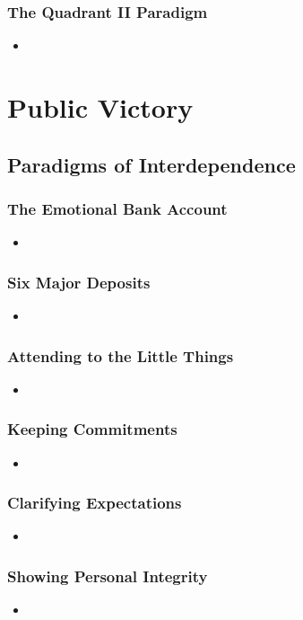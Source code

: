 \documentclass[11pt]{article}
\begin{document}
\subsubsection{The Quadrant II Paradigm}
\begin{itemize}
\item 
\end{itemize}
\section{Public Victory}
\subsection{Paradigms of Interdependence}
\subsubsection{The Emotional Bank Account}
\begin{itemize}
\item 
\end{itemize}
\subsubsection{Six Major Deposits}
\begin{itemize}
\item 
\end{itemize}
\subsubsection{Attending to the Little Things}
\begin{itemize}
\item 
\end{itemize}
\subsubsection{Keeping Commitments}
\begin{itemize}
\item 
\end{itemize}
\subsubsection{Clarifying Expectations}
\begin{itemize}
\item 
\end{itemize}
\subsubsection{Showing Personal Integrity}
\begin{itemize}
\item 
\end{itemize}
\end{document}
